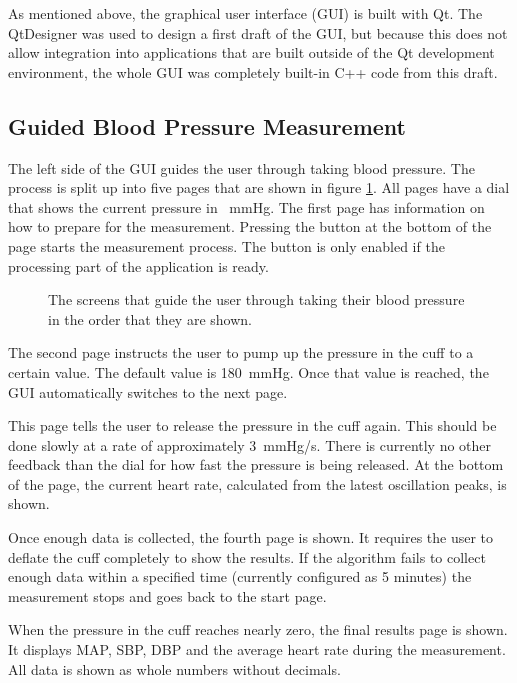 As mentioned above, the graphical user interface (GUI) is built with Qt.
The QtDesigner was used to design a first draft of the GUI, but because this does not allow integration into applications that are built outside of the Qt development environment, the whole GUI was completely built-in C++ code from this draft.

\subsection{Guided Blood Pressure Measurement}
The left side of the GUI guides the user through taking blood pressure. The process is split up into five pages that are shown in figure \ref{fig:UIguide}.  All pages have a dial that shows the current pressure in \SI{}{\mmHg}. The first page has information on how to prepare for the measurement. Pressing the button at the bottom of the page starts the measurement process. The button is only enabled if the processing part of the application is ready.

\begin{figure}[ht]
\centering
\caption{The screens that guide the user through taking their blood pressure in the order that they are shown.}
\label{fig:UIguide}
\end{figure}

The second page instructs the user to pump up the pressure in the cuff to a certain value. The default value is \SI{180}{\mmHg}. Once that value is reached, the GUI automatically switches to the next page.

This page tells the user to release the pressure in the cuff again. This should be done slowly at a rate of approximately \SI{3}{\mmHg/\second}. There is currently no other feedback than the dial for how fast the pressure is being released. At the bottom of the page, the current heart rate, calculated from the latest oscillation peaks, is shown.

Once enough data is collected, the fourth page is shown. It requires the user to deflate the cuff completely to show the results. If the algorithm fails to collect enough data within a specified time (currently configured as 5 minutes) the measurement stops and goes back to the start page.

When the pressure in the cuff reaches nearly zero, the final results page is shown. It displays MAP, SBP, DBP and the average heart rate during the measurement. All data is shown as whole numbers without decimals. 

